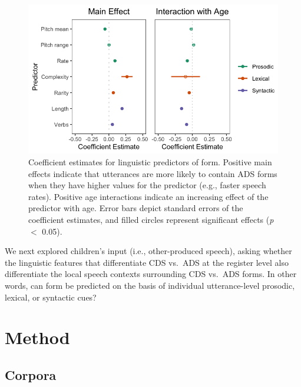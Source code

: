 \documentclass[10pt, letterpaper]{article}
\newenvironment{CodeChunk}{}{}
\begin{document}
\begin{CodeChunk}
\begin{figure}[h]

{\centering \includegraphics{figs/ling-predictors-fig-1} 

}

\caption[Coefficient estimates for linguistic predictors of form]{Coefficient estimates for linguistic predictors of form. Positive main effects indicate that utterances are more likely to contain ADS forms when they have higher values for the predictor (e.g., faster speech rates). Positive age interactions indicate an increasing effect of the predictor with age. Error bars depict standard errors of the coefficient estimates, and filled circles represent significant effects (\textit{p} $<$ 0.05).}\label{fig:ling-predictors-fig}
\end{figure}
\end{CodeChunk}

We next explored children's input (i.e., other-produced speech), asking
whether the linguistic features that differentiate CDS vs.~ADS at the
register level also differentiate the local speech contexts surrounding
CDS vs.~ADS forms. In other words, can form be predicted on the basis of
individual utterance-level prosodic, lexical, or syntactic cues?

\hypertarget{method-1}{%
\section{Method}\label{method-1}}

\hypertarget{corpora-1}{%
\subsection{Corpora}\label{corpora-1}}
\end{document}
